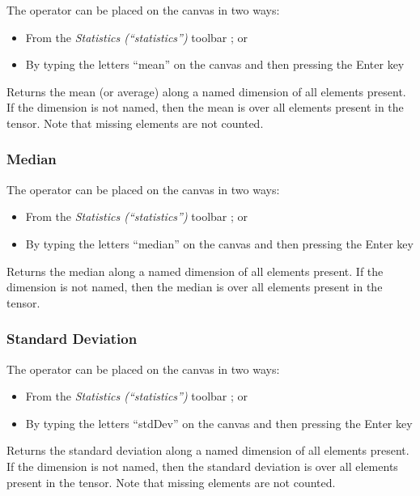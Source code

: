 \label{Operation:mean}


The operator can be placed on the canvas in two ways:
\begin{itemize}
\item From the \emph{Statistics (``statistics'')} toolbar ;
or 
\item By typing the letters ``mean'' on the canvas and then pressing the
Enter key
\end{itemize}
Returns the mean (or average) along a named dimension of all elements
present. If the dimension is not named, then the mean is over all
elements present in the tensor. Note that missing elements are not
counted.

\subsubsection{Median}

\label{Operation:median}

The operator can be placed on the canvas in two ways:
\begin{itemize}
\item From the \emph{Statistics (``statistics'')} toolbar ;
or 
\item By typing the letters ``median'' on the canvas and then pressing the
Enter key
\end{itemize}
Returns the median along a named dimension of all elements present.
If the dimension is not named, then the median is over all elements
present in the tensor.

\subsubsection{Standard Deviation}

\label{Operation:stdDev}


The operator can be placed on the canvas in two ways:
\begin{itemize}
\item From the \emph{Statistics (``statistics'')} toolbar ;
or 
\item By typing the letters ``stdDev'' on the canvas and then pressing the
Enter key
\end{itemize}
Returns the standard deviation along a named dimension of all elements
present. If the dimension is not named, then the standard deviation
is over all elements present in the tensor. Note that missing elements
are not counted.

